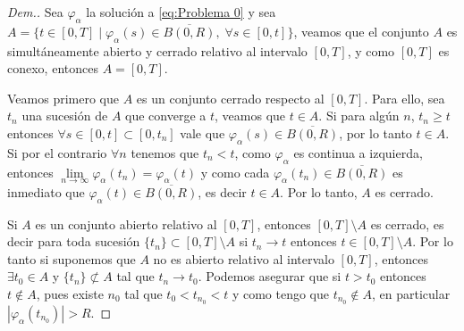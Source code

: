  \begin{proof}[Dem.] Sea $\varphi_\alpha$  la solución a \ref{eq:Problema 0} y sea $A=\{t\in [0,T] \mid \varphi_\alpha(s)\in \overline{B(0,R)}, \; \forall s\in [0,t]\}$, veamos que el conjunto $A$ es simultáneamente abierto y cerrado relativo al intervalo $[0,T]$, y  como $[0,T]$ es conexo, entonces $A=[0,T]$.
  \newpage
  
 Veamos primero que  $A$  es un conjunto cerrado respecto al $[0,T]$. Para ello, sea   $t_n$  una sucesión de $A$ que converge a $t$, veamos que $t\in A$.  Si para algún $n$, $t_n\geq t$ entonces $\forall s \in [0,t]\subset [0,t_n] $ vale que $\varphi_\alpha(s)\in\overline{B(0,R)}$,   por lo tanto  $t\in A$.  Si por el contrario $\forall n$ tenemos que $t_n < t$,  como $\varphi_\alpha$ es continua a izquierda, entonces $\lim\limits_{n\to \infty}\varphi_\alpha(t_n)=\varphi_\alpha(t)$ y como cada $\varphi_\alpha(t_n)\in \overline{B(0,R)}$ es inmediato que $\varphi_\alpha(t)\in \overline{B(0,R)}$, {\color{green} es decir $t\in A$}.  Por lo tanto, $A$ es cerrado.
 	 
  	Si $A$ es un conjunto abierto relativo al $[0,T]$, entonces $[0,T]\setminus A$ es cerrado, es decir para toda sucesión $\{t_n\}\subset [0,T]\setminus A$ si $t_n\to t$ entonces $t\in[0,T]\setminus A$. Por lo tanto si suponemos que  $A$ no es abierto relativo al intervalo $[0,T]$, entonces $\exists t_0\in A$ y $\{t_n\}\nsubset A$ tal que $t_n\to t_0$. Podemos asegurar que si $t> t_0$ entonces $t\notin A$, pues existe $n_0$ tal que $t_0<t_{n_0}<t$ y como tengo que $t_{n_0}\notin A$, en particular $|\varphi_\alpha(t_{n_0})|>R$. 
  	

\end{proof}
